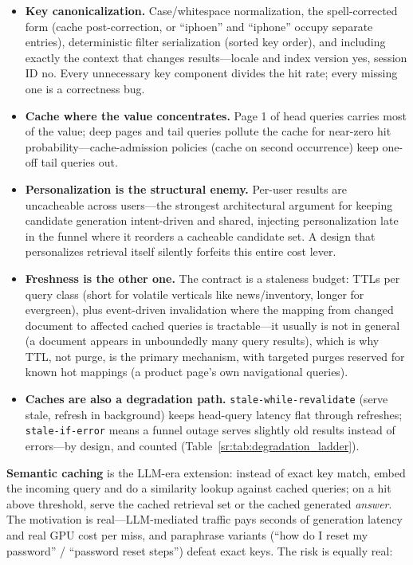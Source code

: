 \begin{itemize}
    \item \textbf{Key canonicalization.} Case/whitespace normalization, the spell-corrected form (cache post-correction, or ``iphoen'' and ``iphone'' occupy separate entries), deterministic filter serialization (sorted key order), and including exactly the context that changes results---locale and index version yes, session ID no. Every unnecessary key component divides the hit rate; every missing one is a correctness bug.
    \item \textbf{Cache where the value concentrates.} Page 1 of head queries carries most of the value; deep pages and tail queries pollute the cache for near-zero hit probability---cache-admission policies (cache on second occurrence) keep one-off tail queries out.
    \item \textbf{Personalization is the structural enemy.} Per-user results are uncacheable across users---the strongest architectural argument for keeping candidate generation intent-driven and shared, injecting personalization late in the funnel where it reorders a cacheable candidate set. A design that personalizes retrieval itself silently forfeits this entire cost lever.
    \item \textbf{Freshness is the other one.} The contract is a staleness budget: TTLs per query class (short for volatile verticals like news/inventory, longer for evergreen), plus event-driven invalidation where the mapping from changed document to affected cached queries is tractable---it usually is not in general (a document appears in unboundedly many query results), which is why TTL, not purge, is the primary mechanism, with targeted purges reserved for known hot mappings (a product page's own navigational queries).
    \item \textbf{Caches are also a degradation path.} \texttt{stale-while-revalidate} (serve stale, refresh in background) keeps head-query latency flat through refreshes; \texttt{stale-if-error} means a funnel outage serves slightly old results instead of errors---by design, and counted (Table~\ref{sr:tab:degradation_ladder}).
\end{itemize}

\textbf{Semantic caching} is the LLM-era extension: instead of exact key match, embed the incoming query and do a similarity lookup against cached queries; on a hit above threshold, serve the cached retrieval set or the cached generated \textit{answer}. The motivation is real---LLM-mediated traffic pays seconds of generation latency and real GPU cost per miss, and paraphrase variants (``how do I reset my password'' / ``password reset steps'') defeat exact keys. The risk is equally real:


